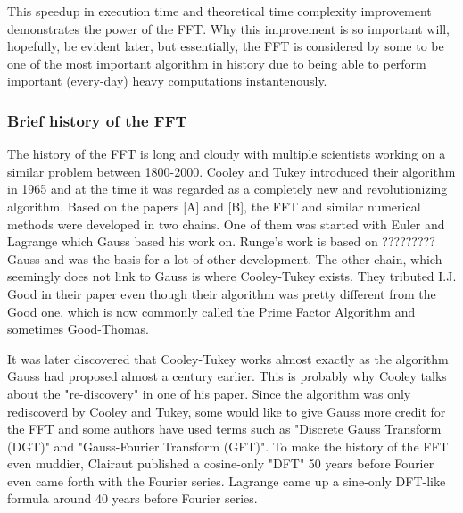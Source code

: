 This speedup in execution time and theoretical time complexity improvement demonstrates the power of the FFT. Why this improvement is so important will, hopefully, be evident later, but essentially, the FFT is considered by some to be one of the most important algorithm in history due to being able to perform important (every-day) heavy computations instantenously. 

\subsubsection{Brief history of the FFT} 
The history of the FFT is long and cloudy with multiple scientists working on a similar problem between 1800-2000. Cooley and Tukey introduced their algorithm in 1965 and at the time it was regarded as a completely new and revolutionizing algorithm. Based on the papers [A] and [B], the FFT and similar numerical methods were developed in two chains. One of them was started with Euler and Lagrange which Gauss based his work on. Runge's work is based on ????????? Gauss and was the basis for a lot of other development. The other chain, which seemingly does not link to Gauss is where Cooley-Tukey exists. They tributed I.J. Good in their paper even though their algorithm was pretty different from the Good one, which is now commonly called the Prime Factor Algorithm and sometimes Good-Thomas. 


It was later discovered that Cooley-Tukey works almost exactly as the algorithm Gauss had proposed almost a century earlier. This is probably why Cooley talks about the "re-discovery" in one of his paper. Since the algorithm was only rediscoverd by Cooley and Tukey, some would like to give Gauss more credit for the FFT and some authors have used terms such as "Discrete Gauss Transform (DGT)" and "Gauss-Fourier Transform (GFT)". To make the history of the FFT even muddier, Clairaut published a cosine-only "DFT" 50 years before Fourier even came forth with the Fourier series. Lagrange came up a sine-only DFT-like formula around 40 years before Fourier series.


